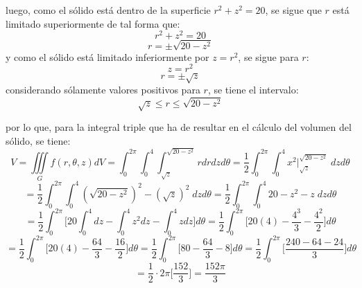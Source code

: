 \documentclass{minimal}
\begin{document}
luego, como el sólido está dentro de la superficie $ r^2 + z^2 = 20 $, se sigue
que $r$ está limitado superiormente de tal forma que:
    $$ r^2 + z^2 = 20 $$
    $$ r = \pm \sqrt{ 20 - z^2 }$$
y como el sólido está limitado inferiormente por $z = r^2$, se sigue para $r$:
    $$ z = r^2  $$
    $$ r = \pm \sqrt z $$
considerando sólamente valores positivos para $r$, se tiene el intervalo:
    $$ \sqrt z \leq r \leq \sqrt{ 20 - z^2 } $$

por lo que, para la integral triple que ha de resultar en el cálculo del
volumen del sólido, se tiene:
    $$ V = \iiint\limits_{G} f(r,\theta,z) dV
         = \int_0^{2\pi} \int_0^4 \int_{\sqrt z}^{\sqrt{20 - z^2}} r drdzd\theta
         = \frac{1}{2} \int_0^{2\pi} \int_0^4
            x^2 \Big|_{\sqrt z}^{\sqrt{20 - z^2}} \; dz d\theta $$
    $$   = \frac{1}{2} \int_0^{2\pi} \int_0^4 (\sqrt{20 - z^2})^2 - (\sqrt z)^2
            \; dz d\theta
         = \frac{1}{2} \int_0^{2\pi} \int_0^4 20 - z^2 - z \; dz d\theta $$
    $$   = \frac{1}{2} \int_0^{2\pi}
            \Big[ 20 \int_0^4  dz - \int_0^4 z^2 dz - \int_0^4 z dz \Big]d\theta
         = \frac{1}{2} \int_0^{2\pi}
            \Big[ 20(4) - \frac{4^3}{3} - \frac{4^2}{2} \Big]d\theta $$
    $$   = \frac{1}{2} \int_0^{2\pi}
            \Big[ 20(4) - \frac{64}{3} - \frac{16}{2} \Big]d\theta
         = \frac{1}{2} \int_0^{2\pi} \Big[ 80 - \frac{64}{3} - 8 \Big]d\theta
         = \frac{1}{2} \int_0^{2\pi} \Big[\frac{240 - 64 - 24}{3} \Big]d\theta$$
    $$   = \frac{1}{2} \cdot 2\pi \Big[\frac{152}{3}\Big] = \frac{152 \pi}{3} $$
\end{document}

